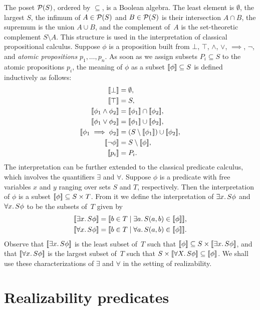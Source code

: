 The poset $\mathcal{P}(S)$, ordered by $\subseteq$, is a Boolean algebra. The
least element is $\emptyset$, the largest $S$, the infimum of $A \in
\mathcal{P}(S)$ and $B \in \mathcal{P}(S)$ is their intersection $A \cap B$, the
supremum is the union $A \cup B$, and the complement of~$A$ is the
set-theoretic complement $S \setminus A$. This structure is used in
the interpretation of classical propositional calculus. Suppose $\phi$
is a proposition built from $\bot$, $\top$, $\land$, $\lor$,
$\implies$, $\lnot$, and \emph{atomic propositions} $p_1, \ldots,
p_n$. As soon as we assign subsets $P_i \subseteq S$ to the atomic
propositions $p_i$, the meaning of $\phi$ as a subset $[\![\phi]\!]
\subseteq S$ is defined inductively as follows:
%
\begin{align*}
  \sem{\bot} &= \emptyset,\\
  \sem{\top} &= S,\\
  \sem{\phi_1 \land \phi_2} &= \sem{\phi_1} \cap \sem{\phi_2},\\
  \sem{\phi_1 \lor \phi_2} &= \sem{\phi_1} \cup \sem{\phi_2},\\
  \sem{\phi_1 \implies \phi_2} &= (S \setminus \sem{\phi_1}) \cup \sem{\phi_2},\\
  \sem{\lnot \phi} &= S \setminus \sem{\phi},\\
  \sem{p_i} &= P_i.
\end{align*}
%
The interpretation can be further extended to the classical predicate
calculus, which involves the quantifiers $\exists$ and $\forall$.
Suppose $\phi$ is a predicate with free variables $x$ and $y$ ranging
over sets $S$ and $T$, respectively. Then the interpretation of $\phi$
is a subset $[\![\phi]\!] \subseteq S \times T$. From it we define the
interpretation of $\exists x .\,{S}{\phi}$ and $\forall x .\,{S}{\phi}$ to be
the subsets of~$T$ given by
%
\begin{align*}
  \sem{\some{x}{S}{\phi}} &=
  \sem{b \in T \such \some{a}{S}{(a,b) \in \sem{\phi}}}, \\
  \sem{\all{x}{S}{\phi}} &=
  \sem{b \in T \such \all{a}{S}{(a,b) \in \sem{\phi}}}.
\end{align*}
%
Observe that $[\![\exists x .\,{S}{\phi}]\!]$ is the least subset of~$T$
such that $[\![\phi]\!] \subseteq S \times [\![\exists x .\,{S}{\phi}]\!]$,
and that $[\![\forall x .\,{S}{\phi}]\!]$ is the largest subset of~$T$ such
that $S \times [\![\forall X .\,{S}{\phi}]\!] \subseteq [\![\phi]\!]$. We shall
use these characterizations of $\exists$ and $\forall$ in the setting
of realizability.

\section{Realizability predicates}
\label{sec:realizability-predicates}


